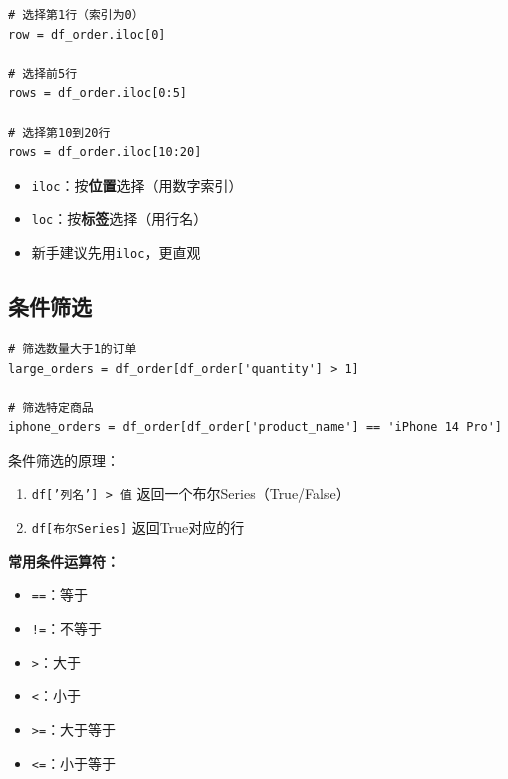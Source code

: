 \documentclass[12pt,a4paper]{article}
\begin{document}
\begin{lstlisting}[caption={使用iloc选择行}]
# 选择第1行（索引为0）
row = df_order.iloc[0]

# 选择前5行
rows = df_order.iloc[0:5]

# 选择第10到20行
rows = df_order.iloc[10:20]
\end{lstlisting}

\begin{knowledgebox}
\begin{itemize}
    \item \texttt{iloc}：按\textbf{位置}选择（用数字索引）
    \item \texttt{loc}：按\textbf{标签}选择（用行名）
    \item 新手建议先用\texttt{iloc}，更直观
\end{itemize}
\end{knowledgebox}

\subsection{条件筛选}

\begin{lstlisting}[caption={条件筛选示例}]
# 筛选数量大于1的订单
large_orders = df_order[df_order['quantity'] > 1]

# 筛选特定商品
iphone_orders = df_order[df_order['product_name'] == 'iPhone 14 Pro']
\end{lstlisting}

\begin{knowledgebox}
条件筛选的原理：
\begin{enumerate}
    \item \texttt{df['列名'] > 值} 返回一个布尔Series（True/False）
    \item \texttt{df[布尔Series]} 返回True对应的行
\end{enumerate}

\textbf{常用条件运算符：}
\begin{itemize}
    \item \texttt{==}：等于
    \item \texttt{!=}：不等于
    \item \texttt{>}：大于
    \item \texttt{<}：小于
    \item \texttt{>=}：大于等于
    \item \texttt{<=}：小于等于
\end{itemize}
\end{knowledgebox}
\end{document}
